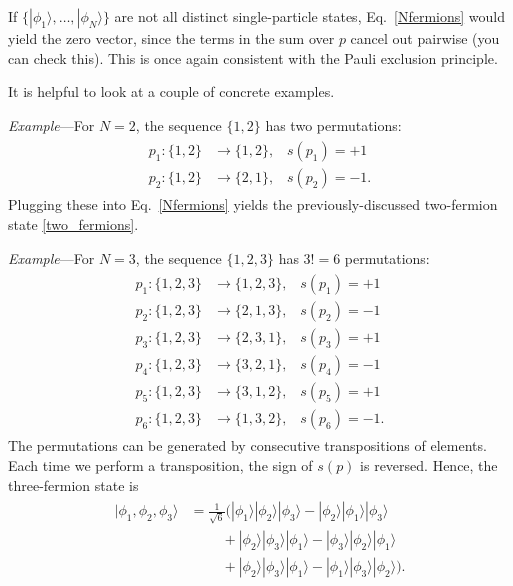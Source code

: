 \documentclass[pra,12pt]{revtex4}
\begin{document}
If $\{|\phi_1\rangle, \dots, |\phi_N\rangle\}$ are not all
distinct single-particle states, Eq.~\eqref{Nfermions} would yield the
zero vector, since the terms in the sum over $p$ cancel out pairwise
(you can check this).  This is once again consistent with the Pauli
exclusion principle.

It is helpful to look at a couple of concrete examples.

\begin{framed}
\noindent
\textit{Example}---For $N=2$, the sequence $\{1,2\}$ has two permutations:
\begin{align}
  \begin{aligned}
    p_1 : \{1,2\} &\rightarrow \{1,2\}, \;\;\;s(p_1) = +1 \\ p_2 : \{1,2\} &\rightarrow \{2,1\}, \;\;\;s(p_2) = -1.\end{aligned}
\end{align}
Plugging these into Eq.~\eqref{Nfermions} yields the
previously-discussed two-fermion state \eqref{two_fermions}.
\end{framed}

\begin{framed}
\noindent
\textit{Example}---For $N=3$, the sequence $\{1,2,3\}$ has $3!=6$ permutations:
\begin{align}
  \begin{aligned}
  p_1 : \{1,2,3\} &\rightarrow \{1,2,3\}, \;\;\;s(p_1) = +1 \\
  p_2 : \{1,2,3\} &\rightarrow \{2,1,3\}, \;\;\;s(p_2) = -1 \\
  p_3 : \{1,2,3\} &\rightarrow \{2,3,1\}, \;\;\;s(p_3) = +1 \\
  p_4 : \{1,2,3\} &\rightarrow \{3,2,1\}, \;\;\;s(p_4) = -1 \\
  p_5 : \{1,2,3\} &\rightarrow \{3,1,2\}, \;\;\;s(p_5) = +1 \\
  p_6 : \{1,2,3\} &\rightarrow \{1,3,2\}, \;\;\;s(p_6) = -1.\end{aligned}
\end{align}
The permutations can be generated by consecutive transpositions of
elements.  Each time we perform a transposition, the sign of $s(p)$ is
reversed.  Hence, the three-fermion state is
\begin{align}
  \begin{aligned}
    |\phi_1, \phi_2, \phi_3\rangle
    &= \frac{1}{\sqrt{6}} \Big(
    |\phi_1\rangle |\phi_2\rangle |\phi_3\rangle
    - |\phi_2\rangle |\phi_1\rangle |\phi_3\rangle \\
    & \qquad\; + |\phi_2\rangle |\phi_3\rangle |\phi_1\rangle
    - |\phi_3\rangle |\phi_2\rangle |\phi_1\rangle \\
    & \qquad\; + |\phi_2\rangle |\phi_3\rangle |\phi_1\rangle
    - |\phi_1\rangle |\phi_3\rangle |\phi_2\rangle \Big).
  \end{aligned}
\end{align}
\end{framed}
\end{document}
